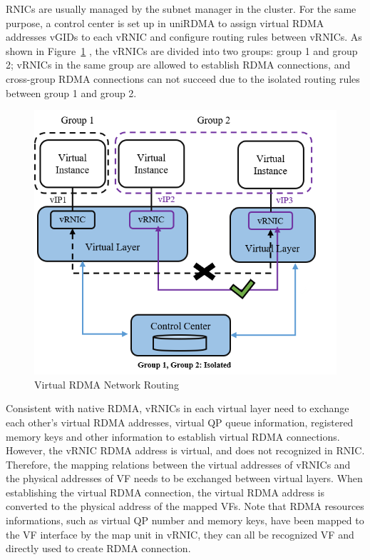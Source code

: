 RNICs are usually managed by the subnet manager in the cluster. For the same purpose, a control center is set up in uniRDMA to assign virtual RDMA addresses vGIDs to each vRNIC and configure routing rules between vRNICs. As shown in Figure~\ref{fig:route-config} , the vRNICs are divided into two groups: group 1 and group 2; vRNICs in the same group are allowed to establish RDMA connections, and cross-group RDMA connections can not succeed due to the isolated routing rules between group 1 and group 2.

\begin{figure}[!ht]
	\centering
	\includegraphics[width=1.0\linewidth]{images/route-config}
	\caption{Virtual RDMA Network Routing}
	\label{fig:route-config}
\end{figure}

Consistent with native RDMA, vRNICs in each virtual layer need to exchange each other's virtual RDMA addresses, virtual QP queue information, registered memory keys and other information to establish virtual RDMA connections. However, the vRNIC RDMA address is virtual, and does not recognized in RNIC. Therefore, the mapping relations between the virtual addresses of vRNICs and the physical addresses of VF needs to be exchanged between virtual layers. When establishing the virtual RDMA connection, the virtual RDMA address is converted to the physical address of the mapped VFs. Note that RDMA resources informations, such as virtual QP number and memory keys, have been mapped to the VF interface by the map unit in vRNIC, they can all be recognized VF and directly used to create RDMA connection.

